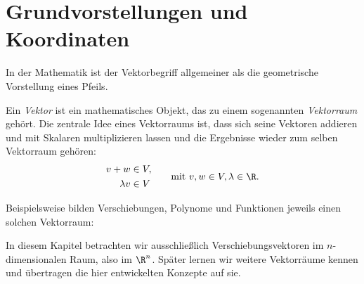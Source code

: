 \section{Grundvorstellungen und Koordinaten}
\label{sec:vector_algebra_fundamentals}

In der Mathematik ist der Vektorbegriff allgemeiner als die geometrische
Vorstellung eines Pfeils.

\begin{RemarkBox}[title=Abstrakter Vektorbegriff]
  \label{rem:vector_algebra_abstract_vector_concept}
  Ein \emph{Vektor}  ist ein mathematisches Objekt, das zu einem sogenannten
  \emph{Vektorraum}  gehört. Die zentrale Idee
  eines Vektorraums ist, dass sich seine Vektoren addieren und mit
  Skalaren multiplizieren lassen und die Ergebnisse wieder zum selben
  Vektorraum gehören:
  \[
    \begin{aligned}
      v+w       &\in V,\\
      \lambda v &\in V
    \end{aligned}
    \qquad
    \text{mit } v,w\in V, \lambda\in\R.
  \]
\end{RemarkBox}

Beispielsweise bilden Verschiebungen, Polynome und Funktionen jeweils einen
solchen Vektorraum:

\begin{center}
\end{center}

In diesem Kapitel betrachten wir ausschließlich Verschiebungsvektoren im
$n$-dimensionalen Raum, also im $\R^n$. Später lernen wir weitere Vektorräume
kennen und übertragen die hier entwickelten Konzepte auf sie.


\clearpage


